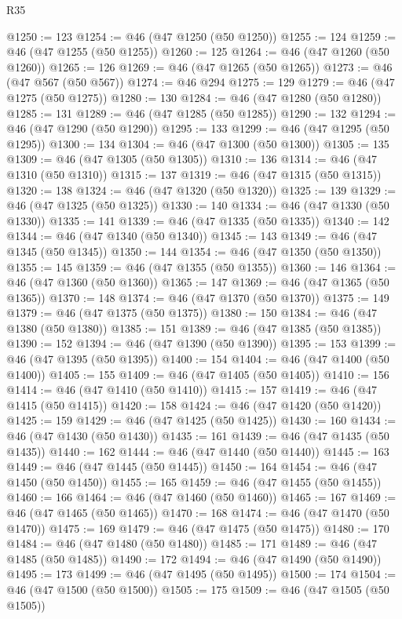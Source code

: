 \begin{lexlean}{R35}
\begin{coremodule}
@1250 := 123
@1254 := @46 (@47 @1250 (@50 @1250))
@1255 := 124
@1259 := @46 (@47 @1255 (@50 @1255))
@1260 := 125
@1264 := @46 (@47 @1260 (@50 @1260))
@1265 := 126
@1269 := @46 (@47 @1265 (@50 @1265))
@1273 := @46 (@47 @567 (@50 @567))
@1274 := @46 @294
@1275 := 129
@1279 := @46 (@47 @1275 (@50 @1275))
@1280 := 130
@1284 := @46 (@47 @1280 (@50 @1280))
@1285 := 131
@1289 := @46 (@47 @1285 (@50 @1285))
@1290 := 132
@1294 := @46 (@47 @1290 (@50 @1290))
@1295 := 133
@1299 := @46 (@47 @1295 (@50 @1295))
@1300 := 134
@1304 := @46 (@47 @1300 (@50 @1300))
@1305 := 135
@1309 := @46 (@47 @1305 (@50 @1305))
@1310 := 136
@1314 := @46 (@47 @1310 (@50 @1310))
@1315 := 137
@1319 := @46 (@47 @1315 (@50 @1315))
@1320 := 138
@1324 := @46 (@47 @1320 (@50 @1320))
@1325 := 139
@1329 := @46 (@47 @1325 (@50 @1325))
@1330 := 140
@1334 := @46 (@47 @1330 (@50 @1330))
@1335 := 141
@1339 := @46 (@47 @1335 (@50 @1335))
@1340 := 142
@1344 := @46 (@47 @1340 (@50 @1340))
@1345 := 143
@1349 := @46 (@47 @1345 (@50 @1345))
@1350 := 144
@1354 := @46 (@47 @1350 (@50 @1350))
@1355 := 145
@1359 := @46 (@47 @1355 (@50 @1355))
@1360 := 146
@1364 := @46 (@47 @1360 (@50 @1360))
@1365 := 147
@1369 := @46 (@47 @1365 (@50 @1365))
@1370 := 148
@1374 := @46 (@47 @1370 (@50 @1370))
@1375 := 149
@1379 := @46 (@47 @1375 (@50 @1375))
@1380 := 150
@1384 := @46 (@47 @1380 (@50 @1380))
@1385 := 151
@1389 := @46 (@47 @1385 (@50 @1385))
@1390 := 152
@1394 := @46 (@47 @1390 (@50 @1390))
@1395 := 153
@1399 := @46 (@47 @1395 (@50 @1395))
@1400 := 154
@1404 := @46 (@47 @1400 (@50 @1400))
@1405 := 155
@1409 := @46 (@47 @1405 (@50 @1405))
@1410 := 156
@1414 := @46 (@47 @1410 (@50 @1410))
@1415 := 157
@1419 := @46 (@47 @1415 (@50 @1415))
@1420 := 158
@1424 := @46 (@47 @1420 (@50 @1420))
@1425 := 159
@1429 := @46 (@47 @1425 (@50 @1425))
@1430 := 160
@1434 := @46 (@47 @1430 (@50 @1430))
@1435 := 161
@1439 := @46 (@47 @1435 (@50 @1435))
@1440 := 162
@1444 := @46 (@47 @1440 (@50 @1440))
@1445 := 163
@1449 := @46 (@47 @1445 (@50 @1445))
@1450 := 164
@1454 := @46 (@47 @1450 (@50 @1450))
@1455 := 165
@1459 := @46 (@47 @1455 (@50 @1455))
@1460 := 166
@1464 := @46 (@47 @1460 (@50 @1460))
@1465 := 167
@1469 := @46 (@47 @1465 (@50 @1465))
@1470 := 168
@1474 := @46 (@47 @1470 (@50 @1470))
@1475 := 169
@1479 := @46 (@47 @1475 (@50 @1475))
@1480 := 170
@1484 := @46 (@47 @1480 (@50 @1480))
@1485 := 171
@1489 := @46 (@47 @1485 (@50 @1485))
@1490 := 172
@1494 := @46 (@47 @1490 (@50 @1490))
@1495 := 173
@1499 := @46 (@47 @1495 (@50 @1495))
@1500 := 174
@1504 := @46 (@47 @1500 (@50 @1500))
@1505 := 175
@1509 := @46 (@47 @1505 (@50 @1505))

\end{coremodule}
\end{lexlean}
